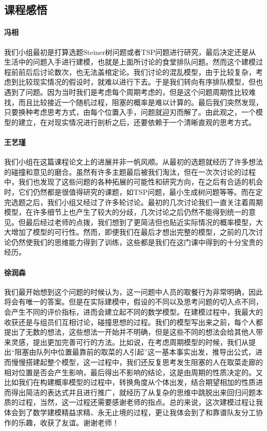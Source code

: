 \documentclass[lang=cn,10pt,a4paper]{elegantpaper}
\begin{document}
\subsection{课程感悟}
\paragraph{冯相}
我们小组最初是打算选题Steiner树问题或者TSP问题进行研究，最后决定还是从生活中的问题入手进行建模，也就是上面所讨论的食堂排队问题。然而这个建模过程前前后后讨论数次，也无法盖棺定论。我们讨论的混乱模型，由于比较复杂，考虑到比较现实情况的假设时，就难以进行下去。于是我们转向有序排队模型，但也遇到了问题。因为当时我们是考虑每个周期考虑的，但是这个问题周期性比较难找，而且比较接近一个随机过程，阻塞的概率是难以计算的。最后我们突然发现，只要换种考虑思考方式，由每个位置入手，问题就迎刃而解了。由此观之，一个模型的建立，在对现实情况进行剖析之后，还要依赖于一个清晰直观的思考方式。
\paragraph{王艺瑾}
我们小组在这篇课程论文上的进展并非一帆风顺。从最初的选题就经历了许多想法的碰撞和意见的磨合。虽然有许多主题最后被我们淘汰，但在一次次讨论的过程中，我们也发现了这些问题的各种拓展的可能性和研究方向，在之后有合适的机会时，它们仍然都是很值得研究的课题，如TSP问题，最小生成树问题等等。而在定完选题之后，我们小组又经过了许多轮讨论。最初的几次讨论我们一直关注着周期模型，在许多细节上也产生了较大的分歧，几次讨论之后仍然不能得到统一的意见。但最后经过老师的点拨，我们想到了更简洁但也贴近实际情况的概率模型，大大增加了模型的可行性。然而，即便我们在最后才想出完整的模型，之前的几次讨论仍然使我们的思维能力得到了训练，这些都是我们在这门课中得到的十分宝贵的经历。
\paragraph{徐润森}
我们最开始想到这个问题的时候认为，这一问题中人员的取餐行为非常明确，因此将会有唯一的答案。但是在实际建模中，假设的不同以及思考问题的切入点不同，会产生不同的评价指标，进而会建立起不同的数学模型。在建模过程中，我最大的收获还是与组员们互相讨论，碰撞思想的过程。我们的模型写出来之前，每个人都提出了无数的想法，这些想法一开始并不明确，但是这些不同的想法会给其他人带来灵感，提出更加完善可行的方法。比如说，在考虑周期模型的时候，我们从提出“阻塞由队列中位置最靠前的取菜的人引起”这一基本事实出发，推导出公式，进而慢慢搭建起整个模型，这一过程中，我们还反复思考发生阻塞的人在取菜走廊的相对位置是否会产生影响，最后得出不影响的结论，这是由周期的性质决定的。又比如我们在构建概率模型的过程中，转换角度从个体出发，结合期望相加的性质进而得出简洁的表达式并且进行推广，就经历了从复杂的思维中跳脱出来回归问题本质的过程，当然，这一过程还需要感谢老师的指点。总的来说，这次建模过程让我体会到了数学建模精益求精、永无止境的过程，更让我体会到了和靠谱队友分工协作的乐趣，收获了友谊。谢谢老师！
\end{document}
